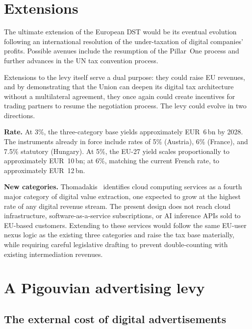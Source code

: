 \documentclass[../../main]{subfiles}
\begin{document}
\section{Extensions}
\label{sec:extensions}


The ultimate extension of the European DST would be its eventual evolution following an international resolution of the under-taxation of digital companies' profits.
Possible avenues include the resumption of the Pillar~One process and further advances in the UN tax convention process.

Extensions to the levy itself serve a dual purpose: they could raise EU revenues, and by demonstrating that the Union can deepen its digital tax architecture without a multilateral agreement, they once again could create incentives for trading partners to resume the negotiation process.
The levy could evolve in two directions.

\textbf{Rate.} At 3\%, the three-category base yields approximately EUR~6\,bn by 2028. The instruments already in force include rates of 5\% (Austria), 6\% (France), and 7.5\% statutory (Hungary). At 5\%, the EU-27 yield scales proportionally to approximately EUR~10\,bn; at 6\%, matching the current French rate, to approximately EUR~12\,bn. %

\textbf{New categories.} Thomadakis~\citep{ep_budg_digital_levy_seminar_jun2026} identifies cloud computing services as a fourth major category of digital value extraction, one expected to grow at the highest rate of any digital revenue stream. The present design does not reach cloud infrastructure, software-as-a-service subscriptions, or AI inference APIs sold to EU-based customers. Extending to these services would follow the same EU-user nexus logic as the existing three categories and raise the tax base materially, while requiring careful legislative drafting to prevent double-counting with existing intermediation revenues.

\section{A Pigouvian advertising levy}
\label{sec:pigouvian}
\subsection{The external cost of digital advertisements}
\end{document}
